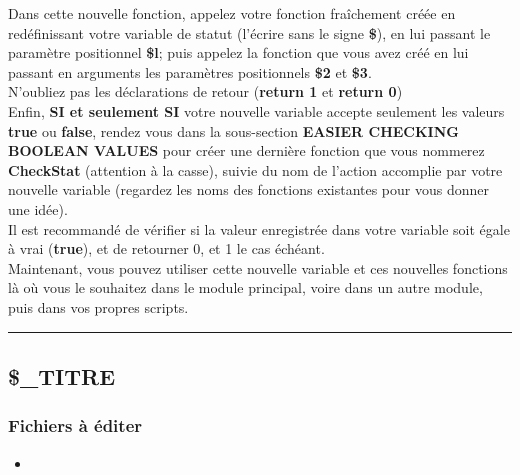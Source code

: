 \documentclass[a4paper,10pt]{article}
\begin{document}
Dans cette nouvelle fonction, appelez votre fonction fraîchement créée en redéfinissant votre variable de statut (l'écrire sans le signe \textbf{\$}), en lui passant le paramètre positionnel \textbf{\$l}; puis appelez la fonction que vous avez créé en lui passant en arguments les paramètres positionnels \textbf{\$2} et \textbf{\$3}.\\[1\baselineskip]

N'oubliez pas les déclarations de retour (\textbf{\color{gray}return 1} et \textbf{\color{gray}return 0})\\[2\baselineskip]


Enfin, \textbf{SI et seulement SI} votre nouvelle variable accepte seulement les valeurs \textbf{true} ou \textbf{false}, rendez vous dans la sous-section \textbf{EASIER CHECKING BOOLEAN VALUES} pour créer une dernière fonction que vous nommerez \textbf{\color{mauve}CheckStat} (attention à la casse), suivie du nom de l'action accomplie par votre nouvelle variable (regardez les noms des fonctions existantes pour vous donner une idée).\\[1\baselineskip]

Il est recommandé de vérifier si la valeur enregistrée dans votre variable soit égale à vrai (\textbf{true}), et de retourner 0, et 1 le cas échéant.\\[2\baselineskip]

Maintenant, vous pouvez utiliser cette nouvelle variable et ces nouvelles fonctions là où vous le souhaitez dans le module principal, voire dans un autre module, puis dans vos propres scripts.\\[1\baselineskip]




\color{green}\par\noindent\rule{\textwidth}{0.4pt}\color{white}

\color{green}
\subsection{\$\_TITRE}\color{white}

\color{blue}
\subsubsection{Fichiers à éditer}\color{white}

\begin{itemize}
    \item \textbf{\color{lime}\color{white}}
\end{itemize}
\end{document}
